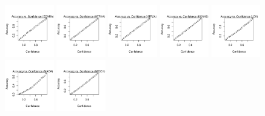 \documentclass[10pt,article]{memoir}
\begin{document}
\begin{figure}[h!]
\includegraphics[width=0.19\textwidth]{figures/calibration_plots/ednra_calib.pdf}
\includegraphics[width=0.19\textwidth]{figures/calibration_plots/htr1a_calib.pdf}
\includegraphics[width=0.19\textwidth]{figures/calibration_plots/htr2a_calib.pdf}
\includegraphics[width=0.19\textwidth]{figures/calibration_plots/kcnh2_calib.pdf}
\includegraphics[width=0.19\textwidth]{figures/calibration_plots/lck_calib.pdf}
\includegraphics[width=0.19\textwidth]{figures/calibration_plots/maoa_calib.pdf}
\includegraphics[width=0.19\textwidth]{figures/calibration_plots/nr3c1_calib.pdf}

\end{figure}
\end{document}
